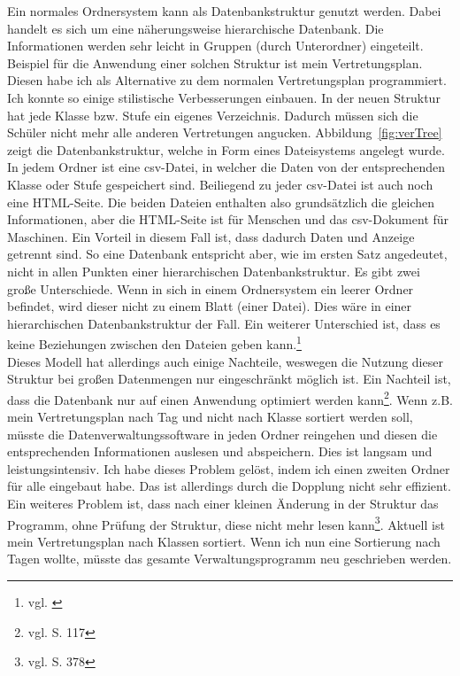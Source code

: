 \documentclass[a4paper, 12pt]{article}
\theoremstyle{plain}
\theoremstyle{definition}
\begin{document}
	Ein normales Ordnersystem kann als Datenbankstruktur genutzt werden. Dabei handelt es sich um eine näherungsweise hierarchische Datenbank. Die Informationen werden sehr leicht in Gruppen (durch Unterordner) eingeteilt. Beispiel für die Anwendung einer solchen Struktur ist mein Vertretungsplan. Diesen habe ich als Alternative zu dem normalen Vertretungsplan programmiert. Ich konnte so einige stilistische Verbesserungen einbauen. In der neuen Struktur hat jede Klasse bzw. Stufe ein eigenes Verzeichnis. Dadurch müssen sich die Schüler nicht mehr alle anderen Vertretungen angucken.  Abbildung~\ref{fig:verTree} zeigt die Datenbankstruktur, welche in Form eines Dateisystems angelegt wurde. In jedem Ordner ist eine csv-Datei, in welcher die Daten von der entsprechenden Klasse oder Stufe gespeichert sind. Beiliegend zu jeder csv-Datei ist auch noch eine HTML-Seite. Die beiden Dateien enthalten also grundsätzlich die gleichen Informationen, aber die HTML-Seite ist für Menschen und das csv-Dokument für Maschinen. Ein Vorteil in diesem Fall ist, dass dadurch Daten und Anzeige getrennt sind. So eine Datenbank entspricht aber, wie im ersten Satz angedeutet, nicht in allen Punkten einer hierarchischen Datenbankstruktur. Es gibt zwei große Unterschiede. Wenn in sich in einem Ordnersystem ein leerer Ordner befindet, wird dieser nicht zu einem Blatt (einer Datei). Dies wäre in einer hierarchischen Datenbankstruktur der Fall. Ein weiterer Unterschied ist, dass es keine Beziehungen zwischen den Dateien geben kann.\footnote{vgl. \cite{hierDbWiki}}\\
Dieses Modell hat allerdings auch einige Nachteile, weswegen die Nutzung dieser Struktur bei großen Datenmengen nur eingeschränkt möglich ist. Ein Nachteil ist, dass die Datenbank nur auf einen Anwendung optimiert werden kann\footnote{vgl. \cite{Jarosch2010} S. 117}. Wenn z.B. mein Vertretungsplan nach Tag und nicht nach Klasse sortiert werden soll, müsste die Datenverwaltungssoftware in jeden Ordner reingehen und diesen die entsprechenden Informationen auslesen und abspeichern. Dies ist langsam und leistungsintensiv. Ich habe dieses Problem gelöst, indem ich einen zweiten Ordner für alle eingebaut habe. Das ist allerdings durch die Dopplung nicht sehr effizient. \\
Ein weiteres Problem ist, dass nach einer kleinen Änderung in der Struktur das Programm, ohne Prüfung der Struktur, diese nicht mehr lesen kann\footnote{vgl. \cite{Codd1970} S. 378}. Aktuell ist mein Vertretungsplan nach Klassen sortiert. Wenn ich nun eine Sortierung nach Tagen wollte, müsste das gesamte Verwaltungsprogramm neu geschrieben werden.
	
\end{document}
